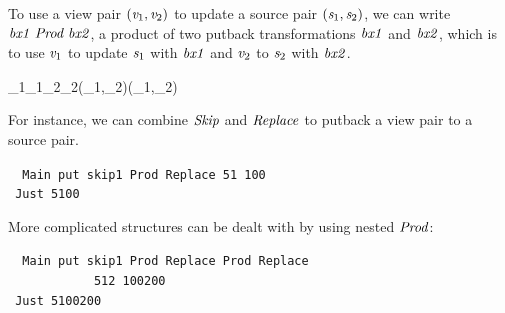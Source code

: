 To use a view pair \ensuremath{(\Varid{v}_{1},\Varid{v}_{2})} to update a source pair
\ensuremath{(\Varid{s}_{1},\Varid{s}_{2})},
we can write \ensuremath{\Varid{bx1}\;\Conid{Prod}\;\Varid{bx2}}, a product of two putback transformations
\ensuremath{\Varid{bx1}} and \ensuremath{\Varid{bx2}},
which is to use \ensuremath{\Varid{v}_{1}} to update \ensuremath{\Varid{s}_{1}} with \ensuremath{\Varid{bx1}} and \ensuremath{\Varid{v}_{2}} to \ensuremath{\Varid{s}_{2}} with \ensuremath{\Varid{bx2}}.
\begin{hscode}\SaveRestoreHook
{}%
%
%
\>[3]{}\mathbin{::}\;_{1}\;_{1}\to {}\;_{2}\;_{2}\to {}\;(_{1},_{2})\;(_{1},_{2}){}\<[E]%
\ColumnHook
\end{hscode}\resethooks
For instance, we can combine \ensuremath{\Conid{Skip}} and \ensuremath{\Conid{Replace}} to putback a view pair
to a source pair.
\begin{tabbing}\tt
~Main~put~skip1~Prod~Replace~51~100\\
\tt ~Just~5100
\end{tabbing}
More complicated structures can be dealt with by using nested \ensuremath{\Conid{Prod}}:
\begin{tabbing}\tt
~Main~put~skip1~Prod~Replace~Prod~Replace\\
\tt ~~~~~~~~~~~~512~100200\\
\tt ~Just~5100200
\end{tabbing}


